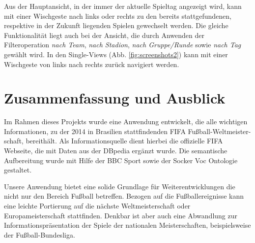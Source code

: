 \documentclass[runningheads,a4paper]{llncs}
\begin{document}

Aus der Hauptansicht, in der immer der aktuelle Spieltag angezeigt wird, kann mit einer Wischgeste nach links oder rechts zu den bereits stattgefundenen, respektive in der Zukunft liegenden Spielen gewechselt werden. Die gleiche Funktionalität liegt auch bei der Ansicht, die durch Anwenden der Filteroperation \textit{nach Team}, \textit{nach Stadion}, \textit{nach Gruppe/Runde} sowie \textit{nach Tag} gewählt wird.
In den Single-Views (Abb. \ref{fig:screenshots2}) kann mit einer Wischgeste von links nach rechts zurück navigiert werden.

\newpage

\section{Zusammenfassung und Ausblick}

Im Rahmen dieses Projekts wurde eine Anwendung entwickelt, die alle wichtigen Informationen, zu der 2014 in Brasilien stattfindenden FIFA Fußball-Weltmeister-schaft, bereithält. Als Informationsquelle dient hierbei die offizielle FIFA Webseite, die mit Daten aus der DBpedia ergänzt wurde. Die semantische Aufbereitung wurde mit Hilfe der BBC Sport sowie der Socker Voc Ontologie gestaltet.  

Unsere Anwendung bietet eine solide Grundlage für Weiterentwicklungen die nicht nur den Bereich Fußball betreffen. Bezogen auf die Fußballereignisse kann eine leichte Portierung auf die nächste Weltmeisterschaft oder Europameisterschaft stattfinden. Denkbar ist aber auch eine Abwandlung zur Informationspräsentation der Spiele der nationalen Meisterschaften, beispielsweise der Fußball-Bundesliga.
\end{document}
